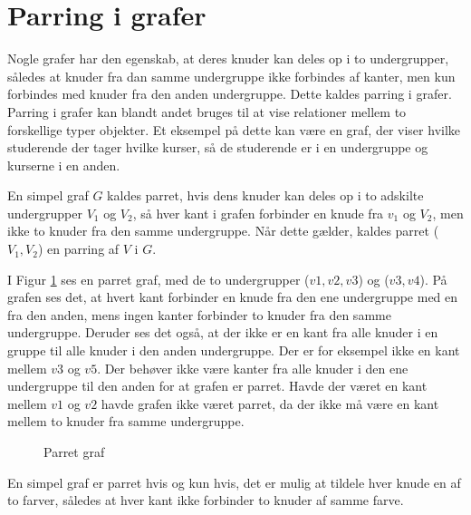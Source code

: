 \section{Parring i grafer}
Nogle grafer har den egenskab, at deres knuder kan deles op i to undergrupper, således at knuder fra dan samme undergruppe ikke forbindes af kanter, men kun forbindes med knuder fra den anden undergruppe.
Dette kaldes parring i grafer.
Parring i grafer kan blandt andet bruges til at vise relationer mellem to forskellige typer objekter.
Et eksempel på dette kan være en graf, der viser hvilke studerende der tager hvilke kurser, så de studerende er i en undergruppe og kurserne i en anden. 

\begin{defn}
En simpel graf $G$ kaldes parret, hvis dens knuder kan deles op i to adskilte undergrupper $V_1$ og $V_2$, så hver kant i grafen forbinder en knude fra $v_1$ og $V_2$, men ikke to knuder fra den samme undergruppe.
Når dette gælder, kaldes parret ($V_1,V_2$) en parring af $V$ i $G$.
\end{defn}

\begin{exmp}
I Figur \ref{parret_graf} ses en parret graf, med de to undergrupper ($v1,v2,v3$) og ($v3,v4$). 
På grafen ses det, at hvert kant forbinder en knude fra den ene undergruppe med en fra den anden, mens ingen kanter forbinder to knuder fra den samme undergruppe. 
Deruder ses det også, at der ikke er en kant fra alle knuder i en gruppe til alle knuder i den anden undergruppe.
Der er for eksempel ikke en kant mellem $v3$ og $v5$. 
Der behøver ikke være kanter fra alle knuder i den ene undergruppe til den anden for at grafen er parret.
Havde der været en kant mellem $v1$ og $v2$ havde grafen ikke været parret, da der ikke må være en kant mellem to knuder fra samme undergruppe.
\end{exmp}

\begin{figure}
\centering
{}
\caption{Parret graf}
\label{parret_graf}
\end{figure}

\begin{thm}
En simpel graf er parret hvis og kun hvis, det er mulig at tildele hver knude en af to farver, således at hver kant ikke forbinder to knuder af samme farve. 

\end{thm}



 